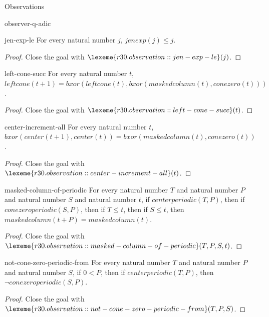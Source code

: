 \begin{lexlean}{Observations}
\begin{section}{observer-q-adic}
\begin{theorem}{jen-exp-le}
For every natural number \(j\), \(jenexp(j) ≤ j\).
\begin{proof}
Close the goal with \(\lexeme{r30.observation::jen-exp-le}(j)\).
\end{proof}
\end{theorem}

\begin{theorem}{left-cone-succ}
For every natural number \(t\), \(leftcone(t + 1) = bxor(leftcone(t), bxor(maskedcolumn(t), conezero(t)))\).
\begin{proof}
Close the goal with \(\lexeme{r30.observation::left-cone-succ}(t)\).
\end{proof}
\end{theorem}

\begin{theorem}{center-increment-all}
For every natural number \(t\), \(bxor(center(t + 1), center(t)) = bxor(maskedcolumn(t), conezero(t))\).
\begin{proof}
Close the goal with \(\lexeme{r30.observation::center-increment-all}(t)\).
\end{proof}
\end{theorem}

\begin{theorem}{masked-column-of-periodic}
For every natural number \(T\) and natural number \(P\) and natural number \(S\) and natural number \(t\), if \(centerperiodic(T, P)\), then if \(conezeroperiodic(S, P)\), then if \(T ≤ t\), then if \(S ≤ t\), then \(maskedcolumn(t + P) = maskedcolumn(t)\).
\begin{proof}
Close the goal with \(\lexeme{r30.observation::masked-column-of-periodic}(T, P, S, t)\).
\end{proof}
\end{theorem}

\begin{theorem}{not-cone-zero-periodic-from}
For every natural number \(T\) and natural number \(P\) and natural number \(S\), if \(0 < P\), then if \(centerperiodic(T, P)\), then \(¬ conezeroperiodic(S, P)\).
\begin{proof}
Close the goal with \(\lexeme{r30.observation::not-cone-zero-periodic-from}(T, P, S)\).
\end{proof}
\end{theorem}


\end{section}
\end{lexlean}
